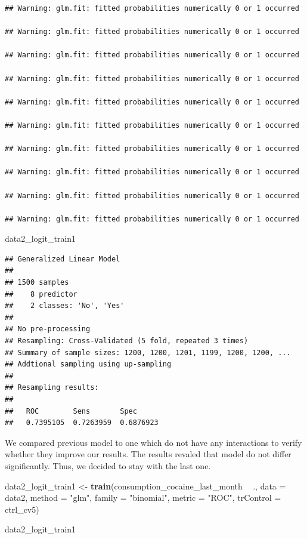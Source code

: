 \documentclass[
]{article}
\newenvironment{Shaded}{\begin{snugshade}}{\end{snugshade}}
\newcommand{\DataTypeTok}[1]{\textcolor[rgb]{0.13,0.29,0.53}{#1}}
\newcommand{\KeywordTok}[1]{\textcolor[rgb]{0.13,0.29,0.53}{\textbf{#1}}}
\newcommand{\NormalTok}[1]{#1}
\newcommand{\OperatorTok}[1]{\textcolor[rgb]{0.81,0.36,0.00}{\textbf{#1}}}
\newcommand{\StringTok}[1]{\textcolor[rgb]{0.31,0.60,0.02}{#1}}
\begin{document}
\begin{verbatim}
## Warning: glm.fit: fitted probabilities numerically 0 or 1 occurred

## Warning: glm.fit: fitted probabilities numerically 0 or 1 occurred

## Warning: glm.fit: fitted probabilities numerically 0 or 1 occurred

## Warning: glm.fit: fitted probabilities numerically 0 or 1 occurred

## Warning: glm.fit: fitted probabilities numerically 0 or 1 occurred

## Warning: glm.fit: fitted probabilities numerically 0 or 1 occurred

## Warning: glm.fit: fitted probabilities numerically 0 or 1 occurred

## Warning: glm.fit: fitted probabilities numerically 0 or 1 occurred

## Warning: glm.fit: fitted probabilities numerically 0 or 1 occurred

## Warning: glm.fit: fitted probabilities numerically 0 or 1 occurred
\end{verbatim}

\begin{Shaded}
\begin{Highlighting}[]
\NormalTok{data2_logit_train1}
\end{Highlighting}
\end{Shaded}

\begin{verbatim}
## Generalized Linear Model 
## 
## 1500 samples
##    8 predictor
##    2 classes: 'No', 'Yes' 
## 
## No pre-processing
## Resampling: Cross-Validated (5 fold, repeated 3 times) 
## Summary of sample sizes: 1200, 1200, 1201, 1199, 1200, 1200, ... 
## Addtional sampling using up-sampling
## 
## Resampling results:
## 
##   ROC        Sens       Spec     
##   0.7395105  0.7263959  0.6876923
\end{verbatim}

We compared previous model to one which do not have any interactions to
verify whether they improve our results. The results revaled that model
do not differ significantly. Thus, we decided to stay with the last one.

\begin{Shaded}
\begin{Highlighting}[]
\NormalTok{data2_logit_train1 <-}\StringTok{ }
\StringTok{  }\KeywordTok{train}\NormalTok{(consumption_cocaine_last_month }\OperatorTok{~}\StringTok{ }\NormalTok{.,}
        \DataTypeTok{data =}\NormalTok{ data2,        }
        \DataTypeTok{method =} \StringTok{"glm"}\NormalTok{,}
        \DataTypeTok{family =} \StringTok{"binomial"}\NormalTok{,}
        \DataTypeTok{metric =} \StringTok{"ROC"}\NormalTok{,}
        \DataTypeTok{trControl =}\NormalTok{ ctrl_cv5)}

\NormalTok{data2_logit_train1}
\end{Highlighting}
\end{Shaded}
\end{document}
